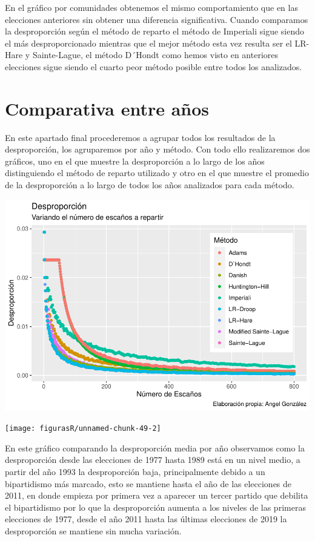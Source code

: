 \documentclass[12pt,a4paper,]{book}
\numberwithin{dummy}{section}
\theoremstyle{ocrenumbox}
\theoremstyle{blacknumex}
\theoremstyle{blacknumbox}
\theoremstyle{ocrenum}
\theoremstyle{ocrenum}
\begin{document}
En el gráfico por comunidades obtenemos el mismo comportamiento que en
las elecciones anteriores sin obtener una diferencia significativa.
Cuando comparamos la desproporción según el método de reparto el método
de Imperiali sigue siendo el más desproporcionado mientras que el mejor
método esta vez resulta ser el LR-Hare y Sainte-Lague, el método D´Hondt
como hemos visto en anteriores elecciones sigue siendo el cuarto peor
método posible entre todos los analizados.

\hypertarget{comparativa-entre-auxf1os}{%
\section{Comparativa entre años}\label{comparativa-entre-auxf1os}}

En este apartado final procederemos a agrupar todos los resultados de la
desproporción, los agruparemos por año y método. Con todo ello
realizaremos dos gráficos, uno en el que muestre la desproporción a lo
largo de los años distinguiendo el método de reparto utilizado y otro en
el que muestre el promedio de la desproporción a lo largo de todos los
años analizados para cada método.

\begin{center}\includegraphics[width=1\linewidth]{figurasR/unnamed-chunk-49-1} \end{center}

\begin{center}\texttt{[image: figurasR/unnamed-chunk-49-2]} \end{center}

En este gráfico comparando la desproporción media por año observamos
como la desproporción desde las elecciones de 1977 hasta 1989 está en un
nivel medio, a partir del año 1993 la desproporción baja, principalmente
debido a un bipartidismo más marcado, esto se mantiene hasta el año de
las elecciones de 2011, en donde empieza por primera vez a aparecer un
tercer partido que debilita el bipartidismo por lo que la desproporción
aumenta a los niveles de las primeras elecciones de 1977, desde el año
2011 hasta las últimas elecciones de 2019 la desproporción se mantiene
sin mucha variación.
\end{document}
